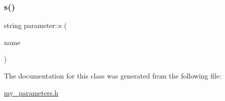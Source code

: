 \mbox{\label{classparameter_a96a4648e43ef0e378f5c8cf638df21ee}} 
\subsubsection{\texorpdfstring{s()}{s()}}
{\footnotesize\ttfamily string parameter\+::s (\begin{DoxyParamCaption}\item[{string}]{name }\end{DoxyParamCaption})\hspace{0.3cm}{\ttfamily [inline]}}



The documentation for this class was generated from the following file\+:\begin{DoxyCompactItemize}
\item 
\hyperlink{my__parameters_8h}{my\+\_\+parameters.\+h}\end{DoxyCompactItemize}
